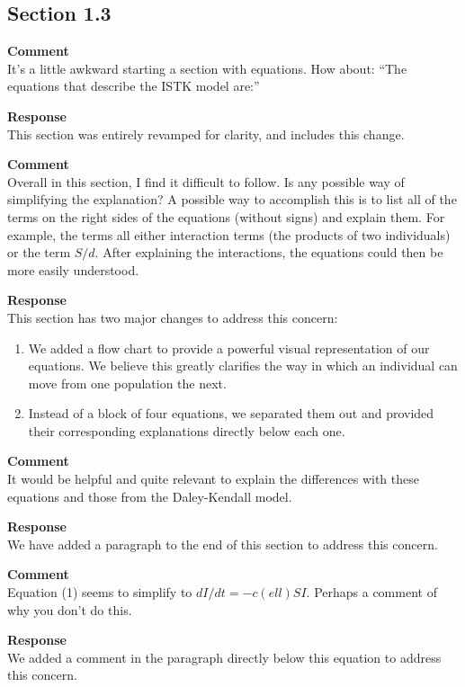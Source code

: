 \subsection{Section 1.3}
\setcounter{rev2-1.3}{1}

\textbf{Comment } \\
It's a little awkward starting a section with equations. How about: ``The equations that describe the ISTK model are:''

\textbf{Response } \\
This section was entirely revamped for clarity, and includes this change.

\textbf{Comment } \\
Overall in this section, I find it difficult to follow.
Is any possible way of simplifying the explanation?
A possible way to accomplish this is to list all of the terms on the right sides of the equations (without signs) and explain them.
For example, the terms all either interaction terms (the products of two individuals) or the term $ S/d $.
After explaining the interactions, the equations could then be more easily understood.

\textbf{Response } \\
This section has two major changes to address this concern:
\begin{enumerate}
    \item We added a flow chart to provide a powerful visual representation of our equations.
    We believe this greatly clarifies the way in which an individual can move from one population the next.
    \item Instead of a block of four equations, we separated them out and provided their corresponding explanations directly below each one.
\end{enumerate}

\textbf{Comment } \\
It would be helpful and quite relevant to explain the differences with these equations and those from the Daley-Kendall model.

\textbf{Response } \\
We have added a paragraph to the end of this section to address this concern.

\textbf{Comment } \\
Equation (1) seems to simplify to $ dI/dt = -c(ell) S I $.
Perhaps a comment of why you don't do this.

\textbf{Response } \\
We added a comment in the paragraph directly below this equation to address this concern.
